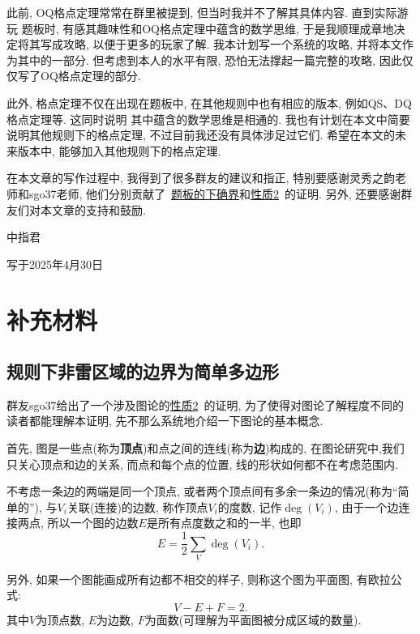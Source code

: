 \documentclass{ctexart}
\newcommand{\varible}[1]{{\Noto[#1]}}
\begin{document}
此前, OQ格点定理常常在群里被提到, 但当时我并不了解其具体内容. 直到实际游玩\varible{O} \varible{Q}题板时, 有感其趣味性和OQ格点定理中蕴含的数学思维, 于是我顺理成章地决定将其写成攻略, 以便于更多的玩家了解. 我本计划写一个系统的\varible{O}\varible{Q}攻略, 并将本文作为其中的一部分. 但考虑到本人的水平有限, 恐怕无法撑起一篇完整的攻略, 因此仅仅写了OQ格点定理的部分.

此外, 格点定理不仅在出现在\varible{O}\varible{Q}题板中, 在其他规则中也有相应的版本, 例如QS、DQ格点定理等. 这同时说明 其中蕴含的数学思维是相通的. 我也有计划在本文中简要说明其他规则下的格点定理, 不过目前我还没有具体涉足过它们. 希望在本文的未来版本中, 能够加入其他规则下的格点定理.

在本文章的写作过程中, 我得到了很多群友的建议和指正, 特别要感谢灵秀之韵老师和sgo37老师, 他们分别贡献了\ \hyperref[inf]{\varible{O}\varible{Q}题板的下确界}和\hyperref[p2]{性质2}\ 的证明. 另外, 还要感谢群友们对本文章的支持和鼓励.

\begin{flushright}
    中指君

    写于2025年4月30日
\end{flushright}
\pagebreak

\appendix

\section{补充材料}
\subsection{\varible{O}\varible{Q}规则下非雷区域的边界为简单多边形}
群友sgo37给出了一个涉及图论的\hyperref[p2]{性质2}\ 的证明, 为了使得对图论了解程度不同的读者都能理解本证明, 先不那么系统地介绍一下图论的基本概念.

首先, 图是一些点(称为\textbf{顶点})和点之间的连线(称为\textbf{边})构成的, 在图论研究中,我们只关心顶点和边的关系, 而点和每个点的位置, 线的形状如何都不在考虑范围内.

不考虑一条边的两端是同一个顶点, 或者两个顶点间有多余一条边的情况(称为``简单的''), 与$V_i$关联(连接)的边数, 称作顶点$V_i$的度数, 记作$\deg(V_i)$, 由于一个边连接两点, 所以一个图的边数$E$是所有点度数之和的一半, 也即
$$
E = \frac{1}{2}\sum_{V}\deg(V_i).
$$

另外, 如果一个图能画成所有边都不相交的样子, 则称这个图为平面图, 有欧拉公式:
$$
V - E + F = 2.
$$
其中$V$为顶点数, $E$为边数, $F$为面数(可理解为平面图被分成区域的数量).
\end{document}
